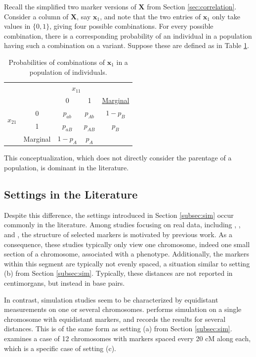 \documentclass{article}
\newcommand{\ve}[1]{\mathbf{#1}}           %
\newcommand{\m}[1]{\mathbf{#1}}               %
\begin{document}
Recall the simplified two marker versions of $\m{X}$ from Section \ref{sec:correlation}. Consider a column of $\m{X}$, say $\ve{x}_1$, and note that the two entries of $\ve{x}_1$ only take values in $\{0,1\}$, giving four possible combinations. For every possible combination, there is a corresponding probability of an individual in a population having such a combination on a variant. Suppose these are defined as in Table \ref{tab:r2}.

\begin{table}[!ht]
  \centering
  \begin{tabular}{c c| c c| c}
    & \multicolumn{1}{c}{} & \multicolumn{2}{c}{$x_{11}$} & \\ \cline{3-4}
    & & 0 & 1 & \underline{Marginal} \\ \cline{2-4}
    \multirow{2}{*}{$x_{21}$} & \multicolumn{1}{|c|}{0} & $p_{ab}$ & $p_{Ab}$ & $1-p_B$ \\
    & \multicolumn{1}{|c|}{1} & $p_{aB}$ & $p_{AB}$ & $p_B$ \\ \cline{2-4}
    & \multicolumn{1}{c}{Marginal} & \multicolumn{1}{c}{$1 - p_A$} & \multicolumn{1}{c}{$p_A$} &  \\ 
  \end{tabular}
  \caption{Probabilities of combinations of $\ve{x}_1$ in a population of individuals.}
  \label{tab:r2}
\end{table}

This conceptualization, which does not directly consider the parentage of a population, is dominant in the literature.

\subsection{Settings in the Literature} \label{subsec:inlit}

Despite this difference, the settings introduced in Section \ref{subsec:sim} occur commonly in the literature. Among studies focusing on real data, including \cite{Galwey2009}, \cite{nyholt2004}, and \cite{Salyakina2005}, the structure of selected markers is motivated by previous work. As a consequence, these studies typically only view one chromosome, indeed one small section of a chromosome, associated with a phenotype. Additionally, the markers within this segment are typically not evenly spaced, a situation similar to setting (b) from Section \ref{subsec:sim}. Typically, these distances are not reported in centimorgans, but instead in base pairs.

In contrast, simulation studies seem to be characterized by equidistant measurements on one or several chromosomes. \cite{cheverud2001} performs simulation on a single chromosome with equidistant markers, and records the results for several distances. This is of the same form as setting (a) from Section \ref{subsec:sim}. \cite{LanderBotstein1989} examines a case of 12 chromosomes with markers spaced every 20 cM along each, which is a specific case of setting (c).
\end{document}

